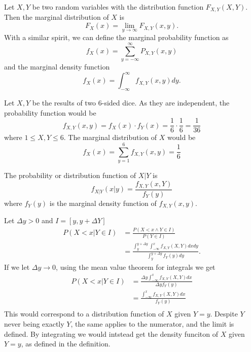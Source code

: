 \begin{definition}
	Let \(X, Y\) be two random variables with the distribution function \(F _{X, Y}(X,Y)\). Then the marginal distribution of \(X\) is
	\[
		F_X(x) = \lim_{y \rightarrow \infty } F_{X, Y}(x, y).
	\]
	With a similar spirit, we can define the marginal probability function as
	\[
		f_X(x) = \sum_{y = - \infty } ^{\infty } P _{X, Y}(x, y)
	\]
	and the marginal density function
	\[
		f_X(x) = \int_{-\infty }^{\infty} f _{X, Y}(x,y) dy.
	\]
\end{definition}

\begin{example}
	Let \(X, Y\) be the results of two 6-sided dice. As they are independent, the probability function would be
	\[
		f _{X, Y}(x, y) = f _X(x)  \cdot f_Y (x) = \frac{1}{6}  \cdot \frac{1}{6} = \frac{1}{36}
	\]
	where \(1 \leq X, Y \leq 6\).
	The marginal distribution of \(X\) would be
	\[
		f _{X}(x) = \sum_{y=1}^{6} f _{X, Y} (x, y) = \frac{1}{6} 
	\]
	
\end{example}

\begin{definition}
	The probability or distribution function of \(X | Y\) is
	\[
		f _{X|Y}(x|y) = \frac{f _{X, Y}(x, Y)}{f _{Y}(y)}
	\]
	where \(f _{Y}(y)\) is the marginal density function of \(f _{X, Y}(x, y)\).
\end{definition}

\begin{obs}
	Let \(\Delta y> 0\) and \(I = \left[y, y + \Delta Y\right]\) 
	\begin{align*}
		P(X<x| Y \in I) &= \frac{P(X<x \land Y \in I)}{P(Y \in I)} \\
										&= \frac{ \int_{y}^{y + \Delta y}\int_{-\infty }^{x} f _{X, Y}(X, Y)dxdy}{\int_{y }^{y + \Delta y} f  _{Y}(y)dy}.
	\end{align*}
	If we let \(\Delta y \rightarrow 0\), using the mean value theorem for integrals we get
	\begin{align*}
		P(X<x | Y \in I) &= \frac{\Delta y\int_{-\infty }^{x} f _{X, Y}(X, Y)dx}{\Delta y f_Y(y)} \\
		&= \frac{\int_{-\infty }^{x} f _{X, Y}(X, Y)dx}{f_Y(y)} \\
	\end{align*}
	This would correspond to a distribution function of \(X\) given \(Y = y\). Despite \(Y\) never being exactly \(Y\), the same applies to the numerator, and the limit is defined. By integrating we would intstead get the density funciton of \(X\) given \(Y = y\), as defined in the definition.
	
	
\end{obs}




